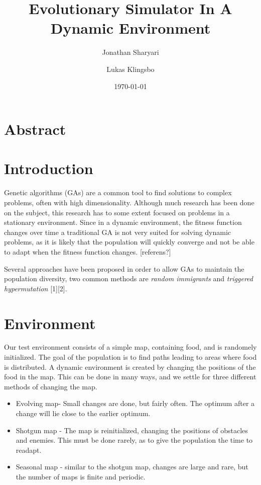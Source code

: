 \documentclass[a4paper,12pt]{article}
\title{\textbf{Evolutionary Simulator In A Dynamic Environment}}
\author{Jonathan Sharyari \and Lukas Klingsbo}  %
\date{\today}
\begin{document}
\maketitle

\section{Abstract}

\section{Introduction}
Genetic algorithms (GAs) are a common tool to find solutions to complex problems, often with high dimensionality. Although much research has been done on the subject, this research has to some extent focused on problems in a stationary environment. Since in a dynamic environment, the fitness function changes over time a traditional GA is not very suited for solving dynamic problems, as it is likely that the population will quickly converge and not be able to adapt when the fitness function changes. [referens?]

Several approaches have been proposed in order to allow GAs to maintain the population diversity, two common methods are \emph{random immigrants} and \emph{triggered hypermutation} [1][2].

\section{Environment}
Our test environment consists of a simple map, containing food, and is randomely initialized. The goal of the population is to find paths leading to areas where food is distributed. A dynamic environment is created by changing the positions of the food in the map. This can be done in many ways, and we settle for three different methods of changing the map.

\begin{itemize}

\item
Evolving map- Small changes are done, but fairly often. The optimum after a change will lie close to the earlier optimum.
\item
Shotgun map - The map is reinitialized, changing the positions of obstacles and enemies. This must be done rarely, as to give the population the time to readapt.
\item
Seasonal map - similar to the shotgun map, changes are large and rare, but the number of maps is finite and periodic.
\end{itemize}
\end{document}

